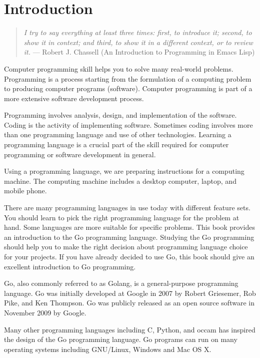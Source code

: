 \cleardoublepage
{}
\chapter{Introduction}

\begin{quote}
\textit{I try to say everything at least three times: first, to
introduce it; second, to show it in context; and third, to show it in a
different context, or to review it.} --- Robert J. Chassell (An Introduction to
Programming in Emacs Lisp)
\end{quote}

Computer programming skill helps you to solve many real-world problems.
Programming is a process starting from the formulation of a computing problem to
producing computer programs (software). Computer programming is part of a more
extensive software development process.

Programming involves analysis, design, and implementation of the software.
Coding is the activity of implementing software. Sometimes coding involves more
than one programming language and use of other technologies. Learning a
programming language is a crucial part of the skill required for computer
programming or software development in general.

Using a programming language, we are preparing instructions for a computing
machine. The computing machine includes a desktop computer, laptop, and mobile
phone.

There are many programming languages in use today with different feature sets.
You should learn to pick the right programming language for the problem at hand.
Some languages are more suitable for specific problems. This book provides an
introduction to the Go programming language. Studying the Go programming should
help you to make the right decision about programming language choice for your
projects. If you have already decided to use Go, this book should give an
excellent introduction to Go programming.

Go, also commonly referred to as Golang, is a general-purpose programming
language. Go was initially developed at Google in 2007 by Robert Griesemer, Rob
Pike, and Ken Thompson. Go was publicly released as an open source software in
November 2009 by Google.

Many other programming languages including C, Python, and occam has inspired the
design of the Go programming language. Go programs can run on many operating
systems including GNU/Linux, Windows and Mac OS X.

